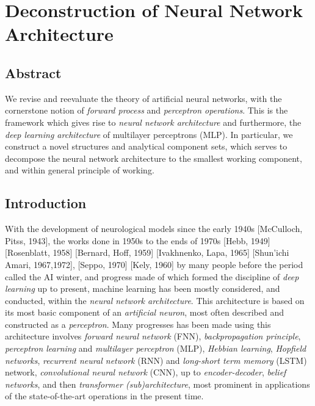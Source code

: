 \chapter{Deconstruction of Neural Network Architecture}
\section{Abstract}
We revise and reevaluate the theory of artificial neural networks, with the cornerstone notion of \textit{forward process} and \textit{perceptron operations}. This is the framework which gives rise to \textit{neural network architecture} and furthermore, the \textit{deep learning architecture} of multilayer perceptrons (MLP). In particular, we construct a novel structures and analytical component sets, which serves to decompose the neural network architecture to the smallest working component, and within general principle of working. 

\section{Introduction}

With the development of neurological models since the early 1940s [McCulloch, Pitss, 1943], the works done in 1950s to the ends of 1970s [Hebb, 1949] [Rosenblatt, 1958] [Bernard, Hoff, 1959] [Ivakhnenko, Lapa, 1965] [Shun'ichi Amari, 1967,1972], [Seppo, 1970] [Kely, 1960] by many people before the period called the AI winter, and progress made of which formed the discipline of \textit{deep learning} up to present, machine learning has been mostly considered, and conducted, within the \textit{neural network architecture}. This architecture is based on its most basic component of an \textit{artificial neuron}, most often described and constructed as a \textit{perceptron}. Many progresses has been made using this architecture involves \textit{forward neural network} (FNN), \textit{backpropagation principle}, \textit{perceptron learning} and \textit{multilayer perceptron} (MLP), \textit{Hebbian learning}, \textit{Hopfield networks}, \textit{recurrent neural network} (RNN) and \textit{long-short term memory} (LSTM) network, \textit{convolutional neural network} (CNN), up to \textit{encoder-decoder}, \textit{belief networks}, and then \textit{transformer (sub)architecture}, most prominent in applications of the state-of-the-art operations in the present time. 

